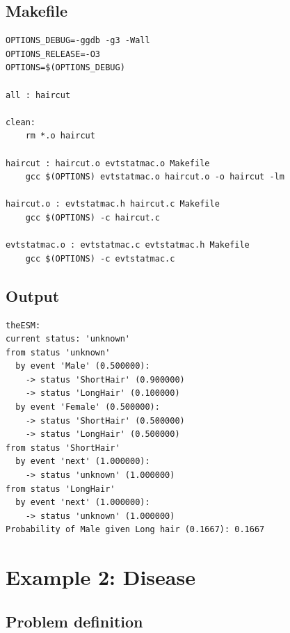 \documentclass[12pt, a4paper]{article}
\begin{document}
\subsection{Makefile}

\begin{scriptsize}
\begin{ttfamily}
\begin{lstlisting}
OPTIONS_DEBUG=-ggdb -g3 -Wall
OPTIONS_RELEASE=-O3 
OPTIONS=$(OPTIONS_DEBUG)

all : haircut

clean:
	rm *.o haircut
	
haircut : haircut.o evtstatmac.o Makefile
	gcc $(OPTIONS) evtstatmac.o haircut.o -o haircut -lm

haircut.o : evtstatmac.h haircut.c Makefile
	gcc $(OPTIONS) -c haircut.c

evtstatmac.o : evtstatmac.c evtstatmac.h Makefile
	gcc $(OPTIONS) -c evtstatmac.c
\end{lstlisting}
\end{ttfamily}
\end{scriptsize}

\subsection{Output}

\begin{scriptsize}
\begin{ttfamily}
\begin{lstlisting}
theESM:
current status: 'unknown'
from status 'unknown'
  by event 'Male' (0.500000):
    -> status 'ShortHair' (0.900000)
    -> status 'LongHair' (0.100000)
  by event 'Female' (0.500000):
    -> status 'ShortHair' (0.500000)
    -> status 'LongHair' (0.500000)
from status 'ShortHair'
  by event 'next' (1.000000):
    -> status 'unknown' (1.000000)
from status 'LongHair'
  by event 'next' (1.000000):
    -> status 'unknown' (1.000000)
Probability of Male given Long hair (0.1667): 0.1667
\end{lstlisting}
\end{ttfamily}
\end{scriptsize}

\section{Example 2: Disease}

\subsection{Problem definition}
\end{document}
